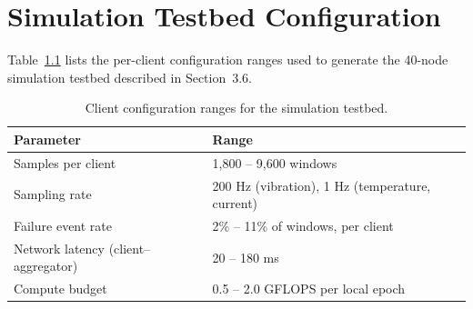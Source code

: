 \chapter{Simulation Testbed Configuration}

Table~\ref{tab:appendix} lists the per-client configuration ranges used to generate the
40-node simulation testbed described in Section~3.6.

\begin{table}[htbp]
\centering
\caption{Client configuration ranges for the simulation testbed.}
\label{tab:appendix}
\begin{tabularx}{\textwidth}{@{}l X@{}}
\toprule
\textbf{Parameter} & \textbf{Range} \\
\midrule
Samples per client & 1{,}800 -- 9{,}600 windows \\
Sampling rate & 200 Hz (vibration), 1 Hz (temperature, current) \\
Failure event rate & 2\% -- 11\% of windows, per client \\
Network latency (client--aggregator) & 20 -- 180 ms \\
Compute budget & 0.5 -- 2.0 GFLOPS per local epoch \\
\bottomrule
\end{tabularx}
\end{table}
